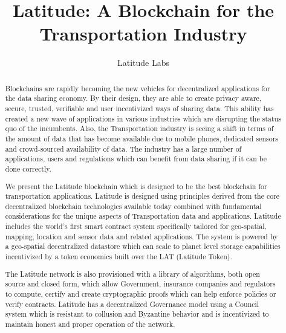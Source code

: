 \documentclass[preprint,10pt]{elsarticle}
\theoremstyle{definition}
\begin{document}
\begin{frontmatter}


\title{\textsf{Latitude: A Blockchain for the Transportation Industry}}

\author{Latitude Labs}
\address{Silicon Valley, California}

\begin{abstract}

Blockchains are rapidly becoming the new vehicles for decentralized applications for the data sharing economy. By their
    design, they are able to create privacy aware, secure, trusted, verifiable and user incentivized ways of sharing
    data. This ability has created a new wave of applications in various industries which are disrupting the status quo
    of the incumbents. Also, the Transportation industry is seeing a shift in terms of the amount of data that has
    become available due to mobile phones, dedicated sensors and crowd-sourced availability of data. The industry has a
    large number of applications, users and regulations which can benefit from data sharing if it can be done correctly.

 We present the Latitude blockchain which is designed to be the best blockchain for transportation applications.
    Latitude is designed using principles derived from the core decentralized blockchain technologies available today
    combined with fundamental considerations for the unique aspects of Transportation data and applications. Latitude
    includes the world's first smart contract system specifically tailored for geo-spatial, mapping, location and sensor
    data and related applications. The system is powered by a geo-spatial decentralized datastore which can scale to
    planet level storage capabilities incentivized by a token economics built over the LAT (Latitude Token).

    The Latitude network is also provisioned with a library of algorithms, both open source and closed form, which allow
    Government, insurance companies and regulators to compute, certify and create cryptographic proofs which can help enforce policies
    or verify contracts.  Latitude has a decentralized Governance model using a Council system which is resistant to
    collusion and Byzantine behavior and is incentivized to maintain honest and proper operation of the network.


\end{abstract}
\end{frontmatter}
\end{document}
